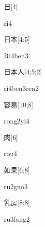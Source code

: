 \begin{verbete}[ri4]{日}[4]
\begin{pronuncia}{ri4}
\end{pronuncia}
\end{verbete}

\begin{verbete}[Ri4ben3]{日本}[4;5]
\begin{pronuncia}{Ri4ben3}
\end{pronuncia}
\end{verbete}

\begin{verbete}{日本人}[4;5;2]
\begin{pronuncia}{ri4ben3ren2}
\end{pronuncia}
\end{verbete}

\begin{verbete}[rong2yi4]{容易}[10;8]
\begin{pronuncia}{rong2yi4}
\end{pronuncia}
\end{verbete}

\begin{verbete}[rou4]{肉}[6]
\begin{pronuncia}{rou4}
\end{pronuncia}
\end{verbete}

\begin{verbete}[ru2guo3]{如果}[6;8]
\begin{pronuncia}{ru2guo3}
\end{pronuncia}
\end{verbete}

\begin{verbete}[ru3fang2]{乳房}[8;8]
\begin{pronuncia}{ru3fang2}
\end{pronuncia}
\end{verbete}

